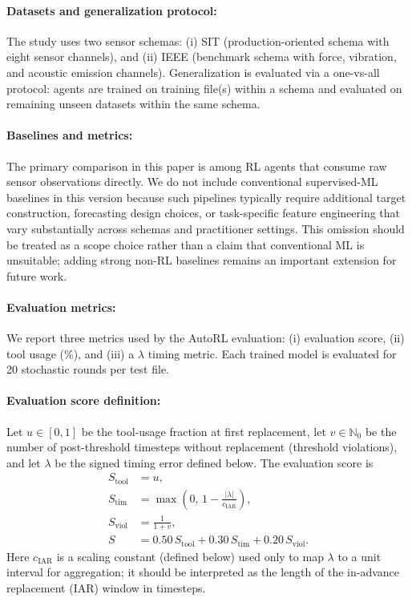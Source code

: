 \documentclass[sn-basic]{sn-jnl} %
\begin{document}
\paragraph{Datasets and generalization protocol:}
The study uses two sensor schemas: (i) SIT (production-oriented schema with eight sensor channels), and (ii) IEEE (benchmark schema with force, vibration, and acoustic emission channels). Generalization is evaluated via a one-vs-all protocol: agents are trained on training file(s) within a schema and evaluated on remaining unseen datasets within the same schema.

\paragraph{Baselines and metrics:}
\label{sec:metrics}
The primary comparison in this paper is among RL agents that consume raw sensor observations directly. We do not include conventional supervised-ML baselines in this version because such pipelines typically require additional target construction, forecasting design choices, or task-specific feature engineering that vary substantially across schemas and practitioner settings. This omission should be treated as a scope choice rather than a claim that conventional ML is unsuitable; adding strong non-RL baselines remains an important extension for future work.

\paragraph{Evaluation metrics:}
We report three metrics used by the AutoRL evaluation: (i) evaluation score, (ii) tool usage (\%), and (iii) a $\lambda$ timing metric. Each trained model is evaluated for 20 stochastic rounds per test file.

\paragraph{Evaluation score definition:}
Let $u\in[0,1]$ be the tool-usage fraction at first replacement, let $v\in\mathbb{N}_0$ be the number of post-threshold timesteps without replacement (threshold violations), and let $\lambda$ be the signed timing error defined below. The evaluation score is
\begin{align}
	S_{\text{tool}} &= u,\\
	S_{\text{tim}} &= \max\left(0,\,1-\frac{|\lambda|}{c_{\mathrm{IAR}}}\right),\\
	S_{\text{viol}} &= \frac{1}{1+v},\\
	S &= 0.50\,S_{\text{tool}} + 0.30\,S_{\text{tim}} + 0.20\,S_{\text{viol}}.
\end{align}
Here $c_{\mathrm{IAR}}$ is a scaling constant (defined below) used only to map $\lambda$ to a unit interval for aggregation; it should be interpreted as the length of the in-advance replacement (IAR) window in timesteps.
\end{document}

